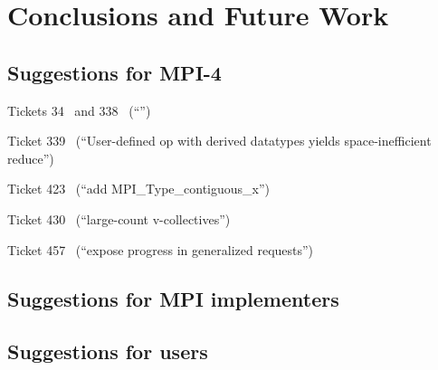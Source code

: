 
\section{Conclusions and Future Work}

\subsection{Suggestions for MPI-4}

Tickets 34~\cite{ticket34} and 338~\cite{ticket338} %
(``'')

Ticket 339~\cite{ticket339} %
(``User-defined op with derived datatypes yields space-inefficient reduce'')

Ticket 423~\cite{ticket423} %
(``add MPI\_Type\_contiguous\_x'')

Ticket 430~\cite{ticket430} %
(``large-count v-collectives'')

Ticket 457~\cite{ticket457} %
(``expose progress in generalized requests'')

\subsection{Suggestions for MPI implementers}

\subsection{Suggestions for users}